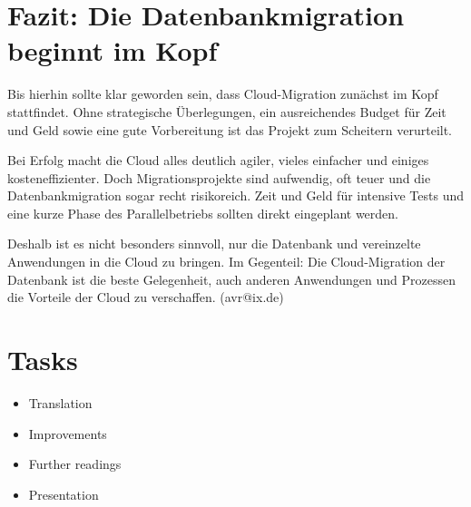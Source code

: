 \section{Fazit: Die Datenbankmigration beginnt im Kopf}

Bis hierhin sollte klar geworden sein, dass Cloud-Migration zunächst im Kopf stattfindet. Ohne strategische Überlegungen, ein ausreichendes Budget für Zeit und Geld sowie eine gute Vorbereitung ist das Projekt zum Scheitern verurteilt.

Bei Erfolg macht die Cloud alles deutlich agiler, vieles einfacher und einiges kosteneffizienter. Doch Migrationsprojekte sind aufwendig, oft teuer und die Datenbankmigration sogar recht risikoreich. Zeit und Geld für intensive Tests und eine kurze Phase des Parallelbetriebs sollten direkt eingeplant werden.

Deshalb ist es nicht besonders sinnvoll, nur die Datenbank und vereinzelte Anwendungen in die Cloud zu bringen. Im Gegenteil: Die Cloud-Migration der Datenbank ist die beste Gelegenheit, auch anderen Anwendungen und Prozessen die Vorteile der Cloud zu verschaffen. (avr@ix.de)


\section{Tasks}


\begin{itemize}
	\item Translation
	\item Improvements
	\item Further readings
	\item Presentation
\end{itemize}